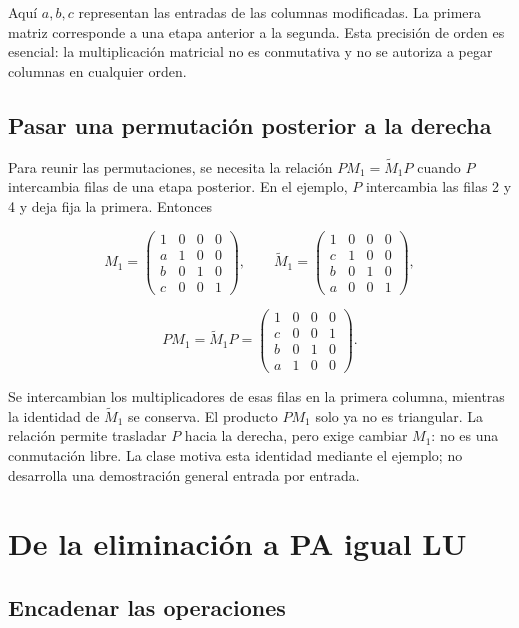 \documentclass[12pt,a4paper]{article}
\begin{document}
Aquí $a,b,c$ representan las entradas de las columnas modificadas. La primera matriz corresponde a una etapa anterior a la segunda. Esta precisión de orden es esencial: la multiplicación matricial no es conmutativa y no se autoriza a pegar columnas en cualquier orden.

\subsection{Pasar una permutación posterior a la derecha}

Para reunir las permutaciones, se necesita la relación $PM_1=\widetilde M_1P$ cuando $P$ intercambia filas de una etapa posterior. En el ejemplo, $P$ intercambia las filas 2 y 4 y deja fija la primera. Entonces

\[
M_1=\begin{pmatrix}1&0&0&0\\a&1&0&0\\b&0&1&0\\c&0&0&1\end{pmatrix},\qquad
\widetilde M_1=\begin{pmatrix}1&0&0&0\\c&1&0&0\\b&0&1&0\\a&0&0&1\end{pmatrix},
\]

\[
PM_1=\widetilde M_1P
=\begin{pmatrix}1&0&0&0\\c&0&0&1\\b&0&1&0\\a&1&0&0\end{pmatrix}.
\]

Se intercambian los multiplicadores de esas filas en la primera columna, mientras la identidad de $\widetilde M_1$ se conserva. El producto $PM_1$ solo ya no es triangular. La relación permite trasladar $P$ hacia la derecha, pero exige cambiar $M_1$: no es una conmutación libre. La clase motiva esta identidad mediante el ejemplo; no desarrolla una demostración general entrada por entrada.

\section{De la eliminación a PA igual LU}

\subsection{Encadenar las operaciones}
\end{document}
